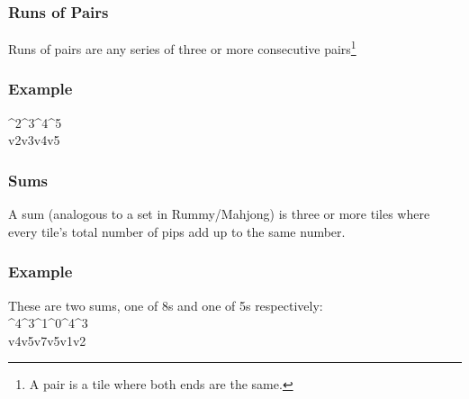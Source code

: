 \subsubsection{Runs of Pairs}
Runs of pairs are any series of three or more consecutive pairs\footnote{A pair is a tile where both ends are the same.}
\subsubsection*{Example}
{\domino ^2^3^4^5\\v2v3v4v5}

\subsubsection{Sums}
A sum (analogous to a set in Rummy/Mahjong) is three or more tiles where every tile's total number of pips add up to the same number.

\subsubsection*{Example}
These are two sums, one of 8s and one of 5s respectively:\\
{ \domino%
    ^4^3^1\hspace{2mm}^0^4^3\\
    v4v5v7\hspace{2mm}v5v1v2
}
